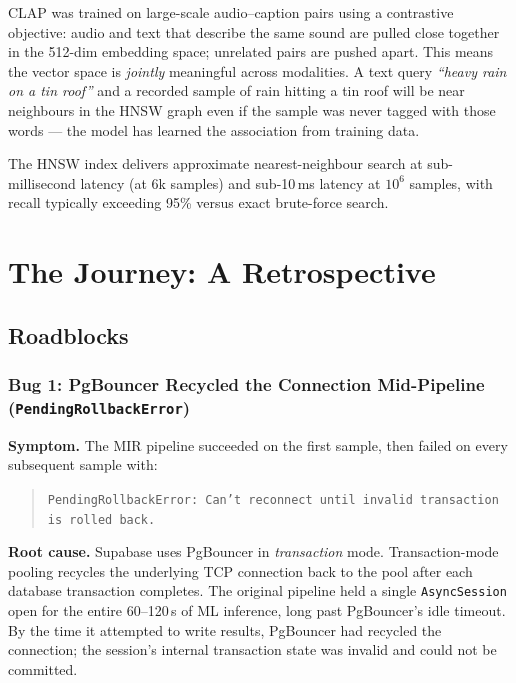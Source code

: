 \documentclass[12pt,letterpaper]{report}
\begin{document}
CLAP was trained on large-scale audio--caption pairs using a contrastive objective: audio and text that describe the same sound are pulled close together in the 512-dim embedding space; unrelated pairs are pushed apart. This means the vector space is \textit{jointly} meaningful across modalities. A text query \textit{``heavy rain on a tin roof''} and a recorded sample of rain hitting a tin roof will be near neighbours in the HNSW graph even if the sample was never tagged with those words --- the model has learned the association from training data.

The HNSW index delivers approximate nearest-neighbour search at sub-millisecond latency (at 6k samples) and sub-10\,ms latency at $10^6$ samples, with recall typically exceeding 95\% versus exact brute-force search.

\chapter{The Journey: A Retrospective}

\section{Roadblocks}

\subsection{Bug 1: PgBouncer Recycled the Connection Mid-Pipeline (\texttt{PendingRollbackError})}

\textbf{Symptom.} The MIR pipeline succeeded on the first sample, then failed on every subsequent sample with:
\begin{quote}
  \texttt{PendingRollbackError: Can't reconnect until invalid transaction is rolled back.}
\end{quote}

\textbf{Root cause.} Supabase uses PgBouncer in \textit{transaction} mode. Transaction-mode pooling recycles the underlying TCP connection back to the pool after each database transaction completes. The original pipeline held a single \texttt{AsyncSession} open for the entire 60--120\,s of ML inference, long past PgBouncer's idle timeout. By the time it attempted to write results, PgBouncer had recycled the connection; the session's internal transaction state was invalid and could not be committed.
\end{document}
